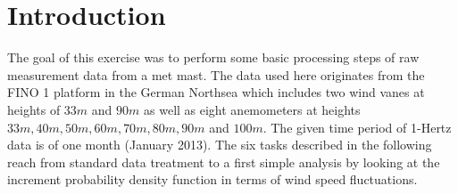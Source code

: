 \documentclass[10pt]{article}
\begin{document}




\onehalfspacing

\tableofcontents
\newpage
\section*{Introduction}
The goal of this exercise was to perform some basic processing steps of raw measurement data from a met mast. The data used here originates from the FINO 1 platform in the German Northsea which includes two wind vanes at heights of $33m$ and $90m$ as well as eight anemometers at heights $33m, 40m, 50m, 60m, 70m, 80m, 90m$ and $100m$. The given time period of 1-Hertz data is of one month (January 2013). The six tasks described in the following reach from standard data treatment to a first simple analysis by looking at the increment probability density function in terms of wind speed fluctuations.
\end{document}
